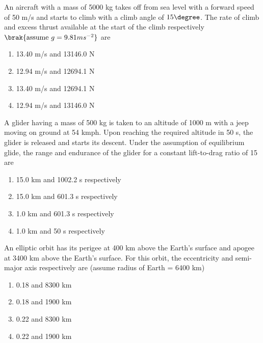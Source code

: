 \iffalse
    \author{EE24BTECH11061}
    \section{ae}
    \chapter{2011}
 \fi
\item An aircraft with a mass of 5000 kg takes off from sea level with a forward speed of 50 m/s and starts to climb with a climb angle of $15 \degree$. The rate of climb and excess thrust available at the start of the climb respectively $\brak{\text{assume }g = 9.81 ms^{-2}}$ are
\begin{multicols}{2}
    \begin{enumerate}
        \item 13.40 m/s and 13146.0 N
        \item 12.94 m/s and 12694.1 N
        \item 13.40 m/s and 12694.1 N
        \item 12.94 m/s and 13146.0 N
    \end{enumerate}
\end{multicols}

\item A glider having a mass of 500 kg is taken to an altitude of 1000 m with a jeep moving on ground at 54 kmph. Upon reaching the required altitude in 50 s, the glider is released and starts its descent. Under the assumption of equilibrium glide, the range and endurance of the glider for a constant lift-to-drag ratio of 15 are
\begin{multicols}{2}
    \begin{enumerate}
        \item 15.0 km and 1002.2 s respectively
        \item 15.0 km and 601.3 s respectively
        \item 1.0 km and 601.3 s respectively
        \item 1.0 km and 50 s respectively
    \end{enumerate}
\end{multicols}
    
\item An elliptic orbit has its perigee at 400 km above the Earth's surface and apogee at 3400 km above the Earth's surface. For this orbit, the eccentricity and semi-major axis respectively are (assume radius of Earth = 6400 km)
\begin{multicols}{2}
    \begin{enumerate}
        \item 0.18 and 8300 km
        \item 0.18 and 1900 km
        \item 0.22 and 8300 km
        \item 0.22 and 1900 km
    \end{enumerate}
\end{multicols}

